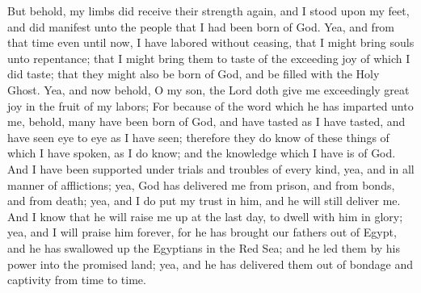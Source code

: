 But behold, my limbs did receive their strength again, and I stood upon my feet, and did manifest unto the people that I had been born of God.
\bverse \iffalse Yea, and from that time even until now, I have labored without ceasing, that I might bring souls unto repentance; that I might bring them to taste of the exceeding joy of which I did taste; that they might also be born of God, and be filled with the Holy Ghost. \fi
Yea, and from that time even until now, I have labored without ceasing, that I might bring souls unto repentance; that I might bring them to taste of the exceeding joy of which I did taste; that they might also be born of God, and be filled with the Holy Ghost.
\bverse \iffalse Yea, and now behold, O my son, the Lord doth give me exceedingly great joy in the fruit of my labors; \fi
Yea, and now behold, O my son, the Lord doth give me exceedingly great joy in the fruit of my labors;
\bverse \iffalse For because of the word which he has imparted unto me, behold, many have been born of God, and have tasted as I have tasted, and have seen eye to eye as I have seen; therefore they do know of these things of which I have spoken, as I do know; and the knowledge which I have is of God. \fi
For because of the word which he has imparted unto me, behold, many have been born of God, and have tasted as I have tasted, and have seen eye to eye as I have seen; therefore they do know of these things of which I have spoken, as I do know; and the knowledge which I have is of God.
\bverse \iffalse And I have been supported under trials and troubles of every kind, yea, and in all manner of afflictions; yea, God has delivered me from prison, and from bonds, and from death; yea, and I do put my trust in him, and he will still deliver me. \fi
And I have been supported under trials and troubles of every kind, yea, and in all manner of afflictions; yea, God has delivered me from prison, and from bonds, and from death; yea, and I do put my trust in him, and he will still deliver me.
\bverse \iffalse And I know that he will raise me up at the last day, to dwell with him in glory; yea, and I will praise him forever, for he has brought our fathers out of Egypt, and he has swallowed up the Egyptians in the Red Sea; and he led them by his power into the promised land; yea, and he has delivered them out of bondage and captivity from time to time. \fi
And I know that he will raise me up at the last day, to dwell with him in glory; yea, and I will praise him forever, for he has brought our fathers out of Egypt, and he has swallowed up the Egyptians in the Red Sea; and he led them by his power into the promised land; yea, and he has delivered them out of bondage and captivity from time to time.
